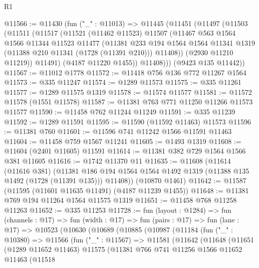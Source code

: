 \begin{lexlean}{R1}
\begin{coremodule}
@11566 := @11430
    (fun ("_" : @11013) =>
    @11445
      (@11451
        (@11497
          (@11503
            (@11511
              (@11517
                (@11521
                  (@11462 @11523)
                  @11507
                  (@11467
                    @563
                    @1564
                    @1566
                    @11344
                    @11523
                    @11477
                    (@11381
                      @233
                      @194
                      @1564
                      @1564
                      @11341
                      @1319
                      (@11388 @210 @11341 (@1728 (@11391 @210)))
                      @11408))
                  (@2930 @11210 @11219))
                @11491)
              (@4187 @11220 @1455))
            @11408)))
      (@9423 @135 @11442))
@11567 := @11012 @1778
@11572 := @11418 @756 @136 @772 @11267 @1564
@11573 := @335 @11247
@11574 := @1289 @11573
@11575 := @335 @11261
@11577 := @1289 @11575 @1319
@11578 := @11574 @11577
@11581 := @11572 @11578 (@1551 @11578)
@11587 := @11381 @763 @771 @11250 @11266 @11573 @11577
@11590 := @11458 @762 @11244 @11249
@11591 := @335 @11239
@11592 := @1289 @11591
@11595 := @11590 (@11592 @11463) @11573
@11596 := @11381 @760
@11601 := @11596 @741 @11242 @1566 @11591 @11463
@11604 := @11458 @759 @1567 @11241
@11605 := @1493 @1319
@11608 := @11604 (@2401 @11605) @11591
@11614 := @11381 @382 @729 @1564 @1566 @381 @11605
@11616 := @1742 @11370 @11
@11635 := @11608
    (@11614
      (@11616 @381)
      (@11381 @186 @194 @1564 @1564 @1492 @1319 (@11388 @135 @1492 (@1728 (@11391 @135))) @11408))
    (@10870 @1461)
@11642 := @11587 (@11595 (@11601 @11635 @11491) (@4187 @11239 @1455))
@11648 := @11381 @769 @194 @11264 @1564 @11575 @1319
@11651 := @11458 @768 @11258 @11263
@11652 := @335 @11253
@11728 := fun (layout : @1284) =>
  fun (channels : @17) =>
  fun (width : @17) =>
  fun (pairs : @17) =>
  fun (lane : @17) =>
  @10523
    (@10630
      (@10689
        (@10885
          (@10987
            (@11184
              (fun ("_" : @10380) =>
              @11566
                (fun ("_" : @11567) =>
                @11581
                  (@11642
                    (@11648
                      (@11651
                        (@1289 @11652 @11463)
                        @11575
                        (@11381
                          @766
                          @741
                          @11256
                          @1566
                          @11652
                          @11463
                          (@11518

\end{coremodule}
\end{lexlean}

